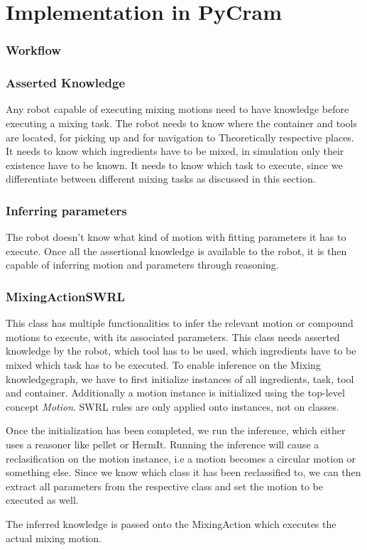 \chapter*{Implementation in PyCram}

\subsection{Workflow}




\subsection{Asserted Knowledge}
Any robot capable of executing mixing motions need to have knowledge before executing a mixing task. 
The robot needs to know where the container and tools are located, for picking up and for navigation to Theoretically
respective places. It needs to know which ingredients have to be mixed, in simulation only their existence have to be known. 
It needs to know which task to execute, since we differentiate between different mixing tasks as discussed in this section. 


\subsection{Inferring parameters}
The robot doesn't know what kind of motion with fitting parameters it has to execute. Once all the assertional knowledge is available
to the robot, it is then capable of inferring motion and parameters through reasoning. 


\subsection{MixingActionSWRL}
This class has multiple functionalities to infer the relevant motion or compound motions to execute, with its associated 
parameters. This class needs asserted knowledge by the robot, which tool has to be used, which ingredients have to be mixed 
which task has to be executed. To enable inference on the Mixing knowledgegraph, we have to first initialize instances of 
all ingredients, task, tool and container. Additionally a motion instance is initialized using the top-level concept \textit{Motion}. 
SWRL rules are only applied onto instances, not on classes. 

Once the initialization has been completed, we run the inference, which either uses a reasoner like pellet or HermIt. 
Running the inference will cause a reclasification on the motion instance, i.e a motion becomes a circular motion or something else. 
Since we know which class it has been reclassified to, we can then extract all parameters from the respective class and set the motion to be executed as well.

The inferred knowledge is passed onto the MixingAction which executes the actual mixing motion. 






